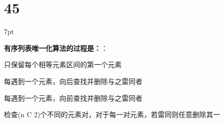 \documentclass[UTF8]{report}
\theoremstyle{MyLineTheoremStyle} %
\theoremstyle{MyBlockTheoremStyle} %
\theoremstyle{MySubsubsectionStyle} %
\newenvironment{graybox}{%
        \def\FrameCommand{%
        \hspace{1pt}%
        {\color{gray}\small \vrule width 2pt}%
        {\color{graybox_color}\vrule width 4pt}%
        \colorbox{graybox_color}%
        }%
        \MakeFramed{\advance\hsize-\width\FrameRestore}%
        \noindent\hspace{-4.55pt}%
        \begin{adjustwidth}{}{7pt}%
        \vspace{2pt}\vspace{2pt}%
        }
        {%
        \vspace{2pt}\end{adjustwidth}\endMakeFramed%
        }
\begin{document}
\section*{45}

\begin{graybox}
\textbf{有序列表唯一化算法的过程是：}：
\begin{circledenum}
    \item 只保留每个相等元素区间的第一个元素
    \item 每遇到一个元素，向后查找并删除与之雷同者
    \item 每遇到一个元素，向前查找并删除与之雷同者
    \item 检查(n C 2)个不同的元素对，对于每一对元素，若雷同则任意删除其一
\end{circledenum}
\end{graybox}
\end{document}
